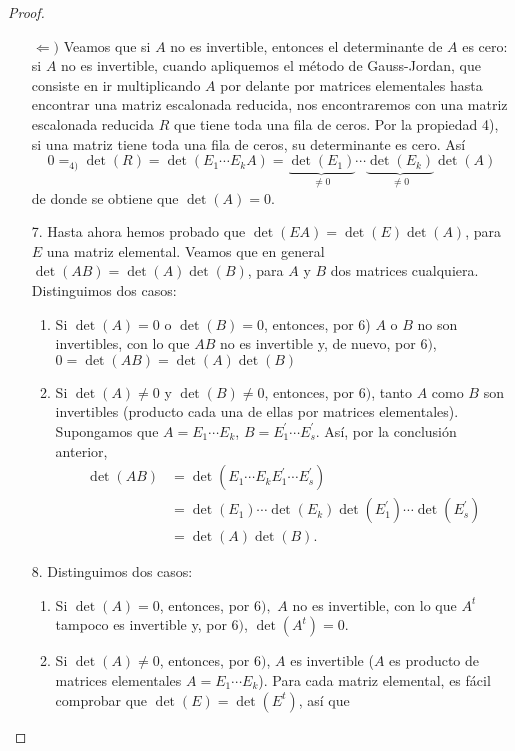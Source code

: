 \begin{proof}
\begin{enumerate}
			\(\Leftarrow ) \) Veamos que si \(A \) no es invertible, entonces el determinante de \(A \) es cero: si \(A \) no es invertible, cuando apliquemos el método de Gauss-Jordan, que consiste en ir multiplicando \(A \) por delante por matrices elementales hasta encontrar una matriz escalonada reducida, nos encontraremos con una matriz escalonada reducida \(R \) que tiene toda una fila de ceros. Por la propiedad 4), si una matriz tiene toda una fila de ceros, su determinante es cero. Así
			\[
				0 =_{4)} \det(R) = \det(E_1 \cdots E_k A) = \underbrace{\det(E_1)}_{\neq 0}   \cdots \underbrace{\det(E_k)}_{\neq 0} \det(A)
			\]
			de donde se obtiene que \(\det(A) = 0 \).
		\item[7.] Hasta ahora hemos probado que \(\det(EA) = \det(E) \det(A )\), para \( E \) una matriz elemental. Veamos que en general \(\det(AB) = \det(A) \det(B )\), para \(A \) y \(B \) dos matrices cualquiera. Distinguimos dos casos:
			\begin{enumerate}
				\item Si \(\det(A) = 0 \) o \(\det(B) = 0 \), entonces, por 6) \(A \) o \(B \) no son invertibles, con lo que \(AB \) no es invertible y, de nuevo, por \(6) \), \(0 = \det(AB) = \det(A) \det(B )\)
				\item Si \(\det(A) \neq 0 \) y \(\det(B) \neq 0 \), entonces, por \(6)\), tanto \(A \) como \(B \) son invertibles (producto cada una de ellas por matrices elementales). Supongamos que \(A = E_1 \cdots E_k \), \(B = E^\prime_1 \cdots E^\prime_s \). Así, por la conclusión anterior,
				      \[
					      \begin{aligned}
						      \det(AB) & = \det(E_1 \cdots E_k E^\prime_1 \cdots E^\prime_s) \\ & = \det(E_1) \cdots \det(E_k) \det(E^\prime_1) \cdots \det(E^\prime_s) \\ & = \det(A) \det(B).
					      \end{aligned}
				      \]
			\end{enumerate}
		\item[8.] Distinguimos dos casos:
			\begin{enumerate}
				\item Si \(\det(A) = 0 \), entonces, por \(6) ,\) \(A \) no es invertible, con lo que \(A^{t } \) tampoco es invertible y, por \(6) \), \(\det(A^{t} ) = 0\).
				\item Si \(\det(A) \neq 0\), entonces, por \(6) \), \(A \) es invertible (\(A \) es producto de matrices elementales \(A = E_1 \cdots E_k \)). Para cada matriz elemental, es fácil comprobar que \(\det(E) = \det(E^{t} )\), así que

\end{enumerate}
\end{enumerate}
\end{proof}
